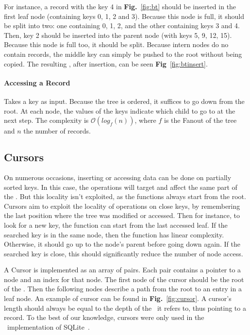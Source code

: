 For instance, a record with the key 4 in \textbf{Fig.}~\ref{fig:bt} should be inserted in the first leaf node (containing keys 0, 1, 2 and 3).
Because this node is full, it should be split into two: one containing 0, 1, 2, and the other containing keys 3 and 4.
Then, key 2 should be inserted into the parent node (with keys 5, 9, 12, 15).
Because this node is full too, it should be split.
Because intern nodes do no contain records, the middle key can simply be pushed to the root without being copied.
The resulting \btree, after insertion, can be seen \textbf{Fig}~\ref{fig:btinsert}.

\beforeinsert
\afterinsert

\paragraph{Accessing a Record} Takes a key as input. Because the tree is ordered, it suffices to go down from the root.
At each node, the values of the keys indicate which child to go to at the next step.
The complexity is $\mathcal{O}(log_{f}(n))$, where $f$ is the Fanout of the tree and $n$ the number of records.

\subsection{Cursors}
On numerous occasions, inserting or accessing data can be done on partially sorted keys.
In this case, the operations will target and affect the same part of the \btree.
But this locality isn't exploited, as the functions always start from the root.
Cursors aim to exploit the locality of operations on close keys, by remembering the last position where the tree was modified or accessed.
Then for instance, to look for a new key, the function can start from the last accessed leaf. If the searched key is in the same node, then the function has linear complexity.
Otherwise, it should go up to the node's parent before going down again. If the searched key is close, this should significantly reduce the number of node access.

A Cursor is implemented as an array of pairs. Each pair contains a pointer to a node and an index for that node.
The first node of the cursor should be the root of the \btree.
Then the following nodes describe a path from the root to an entry in a leaf node.
An example of cursor can be found in \textbf{Fig.}~\ref{fig:cursor}.
A cursor's length should always be equal to the depth of the \btree\ it refers to, thus pointing to a record.
To the best of our knowledge, cursors were only used in the \btrees\ implementation of SQLite~\cite{sqlite}.

